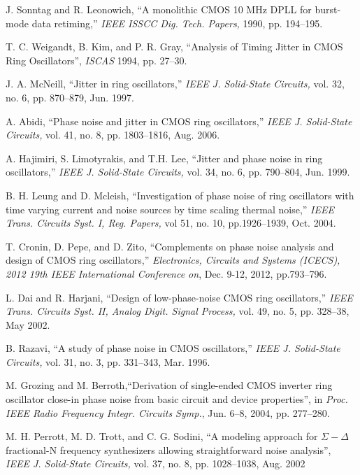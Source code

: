 \begin{thebibliography}{}

 J. Sonntag and R. Leonowich, ``A monolithic CMOS 10 MHz DPLL for burst-mode data retiming,'' {\em IEEE ISSCC Dig. Tech. Papers,} 1990,
pp. 194--195.

 T. C. Weigandt, B. Kim, and P. R. Gray, ``Analysis of Timing Jitter in CMOS Ring Oscillators'', {\em ISCAS} 1994, pp. 27--30.

 J. A. McNeill, ``Jitter in ring oscillators,'' {\em IEEE J. Solid-State Circuits,} vol. 32, no. 6, pp. 870--879, Jun. 1997.

 A. Abidi, ``Phase noise and jitter in CMOS ring oscillators,'' {\em IEEE J. Solid-State Circuits,} vol. 41, no. 8, pp. 1803--1816, Aug. 2006.

 A. Hajimiri, S. Limotyrakis, and T.H. Lee, ``Jitter and phase noise in ring oscillators,'' {\em IEEE J. Solid-State Circuits,} vol. 34, no.
6, pp. 790--804, Jun. 1999.

 B. H. Leung and D. Mcleish, ``Investigation of phase noise of ring oscillators
with time varying current and noise sources by time scaling thermal noise,'' {\em IEEE Trans. Circuits Syst. I, Reg. Papers,} vol 51, no. 10, pp.1926--1939, Oct. 2004.

 T. Cronin, D. Pepe, and D. Zito, ``Complements on phase noise analysis and design of CMOS ring oscillators,'' {\em Electronics, Circuits and Systems
(ICECS), 2012 19th IEEE International Conference on}, Dec. 9-12, 2012, pp.793--796.

  L. Dai and R. Harjani, ``Design of low-phase-noise CMOS ring oscillators,'' {\em IEEE Trans. Circuits Syst. II, Analog Digit. Signal Process,} vol. 49, no. 5, pp.
328--38, May 2002.

 B. Razavi, ``A study of phase noise in CMOS oscillators,'' {\em IEEE J. Solid-State Circuits,} vol. 31, no. 3, pp. 331--343, Mar. 1996.

 M. Grozing and M. Berroth,``Derivation of single-ended CMOS inverter ring oscillator close-in phase noise from basic circuit and device properties'', in {\em Proc.
IEEE Radio Frequency Integr. Circuits Symp.}, Jun. 6--8, 2004, pp. 277--280.

 M. H. Perrott, M. D. Trott, and C. G. Sodini, ``A modeling approach for $\Sigma-\Delta$ fractional-N frequency synthesizers allowing straightforward noise
analysis'', {\em IEEE J. Solid-State Circuits,} vol. 37, no. 8, pp. 1028--1038, Aug. 2002


\end{thebibliography}
